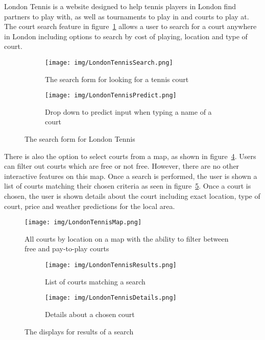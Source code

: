 London Tennis is a website designed to help tennis players in London find partners to play with, as well as tournaments to play in and courts to play at. The court search feature in figure~\ref{fig:LondonTennisSearch} allows a user to search for a court anywhere in London including options to search by cost of playing, location and type of court. 

\begin{figure}[ht]
\centering
\begin{subfigure}[b]{0.6\textwidth}
                   \texttt{[image: img/LondonTennisSearch.png]}
                   \caption{The search form for looking for a tennis court}\label{fig:LondonTennisSearch}
\end{subfigure}%
\qquad
\begin{subfigure}[b]{0.3\textwidth}
\texttt{[image: img/LondonTennisPredict.png]}
\caption{Drop down to predict input when typing a name of a court}\label{fig:LondonTennisMap}
            \end{subfigure}
            \qquad
\caption{The search form for London Tennis}\label{fig:LondonTennisSearchMain}
\end{figure}

There is also the option to select courts from a map, as shown in figure~\ref{fig:LondonTennisMap}. Users can filter out courts which are free or not free. However, there are no other interactive features on this map. Once a search is performed, the user is shown a list of courts matching their chosen criteria as seen in figure~\ref{fig:LondonTennisResults}. Once a court is chosen, the user is shown details about the court including exact location, type of court, price and weather predictions for the local area.

\begin{figure}
\begin{center}
\texttt{[image: img/LondonTennisMap.png]}
\end{center}
\caption{All courts by location on a map with the ability to filter between free and pay-to-play courts}\label{fig:LondonTennisMap}
\end{figure}

\begin{figure}[ht]
\centering
\begin{subfigure}[b]{0.7\textwidth}
                   \texttt{[image: img/LondonTennisResults.png]}
                   \caption{List of courts matching a search}\label{fig:LondonTennisResults}
\end{subfigure}
\begin{subfigure}[b]{0.7\textwidth}
                   \texttt{[image: img/LondonTennisDetails.png]}
                   \caption{Details about a chosen court}\label{fig:LondonTennisDetails}
\end{subfigure}
\caption{The displays for results of a search}\label{fig:LondonTennisResultsMain}
\end{figure}

